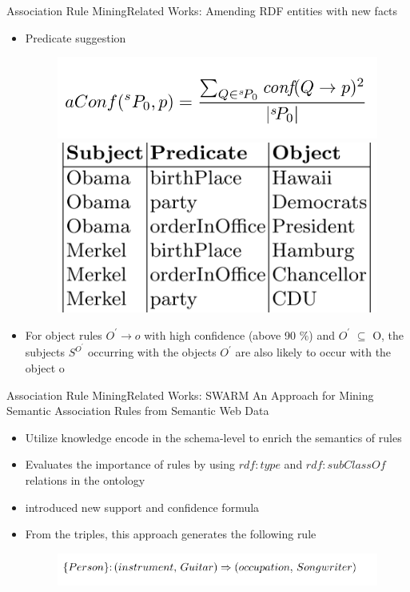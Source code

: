 \documentclass[10pt]{beamer}
\begin{document}
\begin{frame}{Association Rule Mining}{Related Works:  Amending RDF entities with new facts}
	\begin{itemize}
	\item Predicate suggestion
		\begin{figure} 
		 \includegraphics[width=.5\linewidth]{images/suggestion-formula.PNG}
			\includegraphics[width=.4\linewidth]{images/predicate-suggestion.PNG}
		\end{figure}
	\item For object rules $O^\prime \rightarrow o$ with high confidence (above 90 $\%$) and $O^\prime$ $ \subseteq$ O, the subjects  $S^{O^\prime} $	occurring with the objects $O^\prime$ are also likely to occur with the	object o

\end{itemize}
\end{frame}

\begin{frame}{Association Rule Mining}{Related Works:  SWARM}
An Approach for Mining Semantic Association Rules from Semantic Web Data \cite{barati2016swarm}
\begin{itemize}
\item Utilize knowledge encode in the schema-level to enrich the semantics of rules
\item  Evaluates the importance of rules by using $rdf:type$ and $rdf:subClassOf$ relations in the ontology
\item introduced new support and confidence formula
\item From the triples, this approach generates the following rule
	\begin{figure} 
		\centering
		\includegraphics[width=1\linewidth]{images/swarm-example.PNG}
		 
	\end{figure}
\end{itemize}
\end{frame}
	
\end{document}
